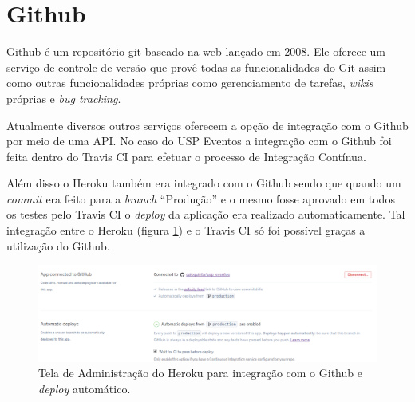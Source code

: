 \section{Github}
\par Github é um repositório git baseado na web lançado em 2008. Ele oferece um serviço de controle de versão que provê todas as funcionalidades do Git assim como outras funcionalidades próprias como gerenciamento de tarefas, \emph{wikis} próprias e \emph{bug tracking}.
\par Atualmente diversos outros serviços oferecem a opção de integração com o Github por meio de uma API. No caso do USP Eventos a integração com o Github foi feita dentro do Travis CI para efetuar o processo de Integração Contínua.
\par Além disso o Heroku também era integrado com o Github sendo que quando um \emph{commit} era feito para a \emph{branch} ``Produção'' e o mesmo fosse aprovado em todos os testes pelo Travis CI o \emph{deploy} da aplicação era realizado automaticamente. Tal integração entre o Heroku (figura \ref{fig:heroku_automatic_deploy}) e o Travis CI só foi possível graças a utilização do Github.
\begin{figure}[htb]
\centering
\includegraphics[width=15cm]{figuras/heroku_automatic_deploy}
\caption{\label{fig:heroku_automatic_deploy} Tela de Administração do Heroku para integração com o Github e \emph{deploy} automático.}
\end{figure}
